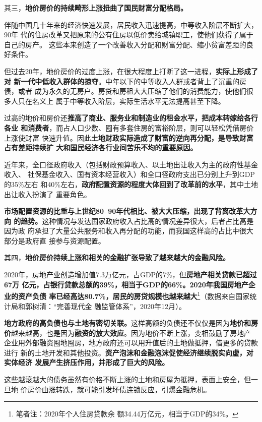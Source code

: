 其三，\textbf{地价房价的持续畸形上涨扭曲了国民财富分配格局。}

伴随中国几十年来的经济快速发展，居民收入迅速提高，中等收入阶层不断扩大，90年
代的住房改革又把原来的公有住房以低价卖给城镇职工，使他们获得了属于自己的房产。
这些本来创造了一个改善收入分配和财富分配、缩小贫富差距的良好条件。

但过去20年，地价房价的过度上涨，在很大程度上打断了这一进程，\textbf{实际上形成了对
  新一代中低收入群体的掠夺}。中年以下的中等收入人群或者背上了沉重的房债，或者
成为永久的无房户。房贷和房租大大压缩了他们的消费能力，使他们很多人只在名义上
属于中等收入阶层，实际生活水平无法提高甚至下降。

过高的地价和房价还\textbf{推高了商业、服务业和制造业的租金水平，把成本转嫁给各行各业
和消费者}，而占人口少数、囤有多套住房的富裕阶层，则可以轻松凭借房价上涨使财富
快速升值。因此\textbf{土地财政实际造成了财富的逆向再分配，是导致财富占有差距持续扩
  大和国民经济各行业间苦乐不均的重要原因。}

近年来，全口径政府收入（包括财政预算收入、以土地出让收入为主的政府性基金收入、
社保基金收入、国有资本经营收入）和全口径政府支出已分别上升到GDP的35\%左右
和40\%左右，\textbf{政府配置资源的程度大体回到了改革前的水平}，其中土地出让收入扮演了
重要角色。

\textbf{市场配置资源的比重与上世纪80--90年代相比、被大大压缩，出现了背离改革大方向
  的趋势。}这种情况与发达国家政府收入占比高的情况差异很大，后者占比高是因为政
府承担了大量公共服务和收入再分配的功能，而我国这样高的占比中很大部分是政府直
接参与资源配置。

其四，\textbf{地价房价持续上涨和相关的金融扩张导致了越来越大的金融风险。}

2020年，房地产业创造增加值7.3万亿元，占GDP的7\%，但\textbf{房地产相关贷款已超过67万
  亿元，占银行贷款总额的39\%，相当于GDP的66\%。2020年我国房地产企业的资产负债
  率已经高达80.7\%，居民的房贷规模也越来越大}\footnote{笔者注：2020年个人住房贷款余
  额34.44万亿元，相当于GDP的34\%。}（数据来自国家统计局和郭树清：“完善现代金
融监管体系”，2020年12月）。

\textbf{地方政府的高负债也与土地有密切关联。}这样高额的负债还不仅仅是因为\textbf{地价和房
  价}越来越高，也是因为\textbf{融资的放大效应}。因为地价不断上涨，变相鼓励了房地产
企业用外部融资囤地囤房，地方政府还可以用升值后的土地做抵押，借更多的贷款进行
新的土地开发和其他投资。\textbf{资产泡沫和金融泡沫促使经济继续脱实向虚，对实体经济
  发展产生挤压作用，并形成了巨大的风险。}

这些越滚越大的债务虽然有价格不断上涨的土地和房屋为抵押，表面上安全，但一旦地
价房价由涨转跌，就可能引发坏债连锁反应，引爆金融危机。

